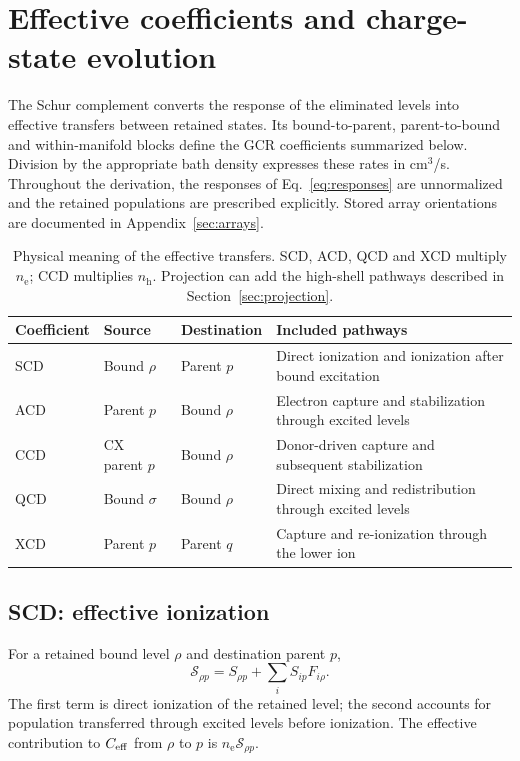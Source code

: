 \documentclass[11pt,a4paper]{article}
\newcommand{\nelec}{n_{\mathrm e}}
\newcommand{\nh}{n_{\mathrm h}}
\numberwithin{equation}{section}
\begin{document}
\section{Effective coefficients and charge-state evolution}\label{sec:gcr}

The Schur complement converts the response of the eliminated levels
into effective transfers between retained states. Its bound-to-parent,
parent-to-bound and within-manifold blocks define the GCR coefficients
summarized below. Division by the appropriate bath density expresses
these rates in cm$^3$/s. Throughout the derivation, the responses of
Eq.~\eqref{eq:responses} are unnormalized and the retained populations
are prescribed explicitly. Stored array orientations are documented
in Appendix~\ref{sec:arrays}.

\begin{table}[htbp]\centering\small
\begin{tabularx}{\textwidth}{lllX}
\toprule Coefficient & Source & Destination & Included pathways\\\midrule
SCD & Bound $\rho$ & Parent $p$ & Direct ionization and ionization after bound excitation\\
ACD & Parent $p$ & Bound $\rho$ & Electron capture and stabilization through excited levels\\
CCD & CX parent $p$ & Bound $\rho$ & Donor-driven capture and subsequent stabilization\\
QCD & Bound $\sigma$ & Bound $\rho$ & Direct mixing and redistribution through excited levels\\
XCD & Parent $p$ & Parent $q$ & Capture and re-ionization through the lower ion\\
\bottomrule
\end{tabularx}
\caption{Physical meaning of the effective transfers. SCD, ACD, QCD and
XCD multiply $\nelec$; CCD multiplies $\nh$. Projection can add the
high-shell pathways described in Section~\ref{sec:projection}.}
\end{table}

\subsection{SCD: effective ionization}

For a retained bound level $\rho$ and destination parent $p$,
\begin{equation}
 \mathcal S_{\rho p}=S_{\rho p}+\sum_iS_{ip}F_{i\rho}.
\end{equation}
The first term is direct ionization of the retained level; the second
accounts for population transferred through excited levels before
ionization. The effective contribution to $C_{\rm eff}$ from $\rho$
to $p$ is $\nelec\mathcal S_{\rho p}$.
\end{document}
